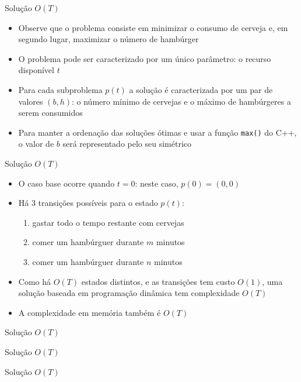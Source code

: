 \begin{frame}[fragile]{Solução $O(T)$}

    \begin{itemize}
        \item Observe que o problema consiste em minimizar o consumo de cerveja e, em segundo lugar,
            maximizar o número de hambúrger

        \item O problema pode ser caracterizado por um único parâmetro: o recurso disponível
            $t$
        
        \item Para cada subproblema $p(t)$ a solução é caracterizada por um par de valores
            $(b, h)$: o número mínimo de cervejas e o máximo de hambúrgeres a serem consumidos 

        \item Para manter a ordenação das soluções ótimas e usar a função \texttt{max()} do 
            C++, o valor de $b$ será representado pelo seu simétrico
   \end{itemize}

\end{frame}

\begin{frame}[fragile]{Solução $O(T)$}

    \begin{itemize}
        \item O caso base ocorre quando $t = 0$: neste caso, $p(0) = (0, 0)$
            
        \item Há 3 transições possíveis para o estado $p(t)$:

        \begin{enumerate}
            \item gastar todo o tempo restante com cervejas
            \item comer um hambúrguer durante $m$ minutos
            \item comer um hambúrguer durante $n$ minutos
        \end{enumerate}

        \item Como há $O(T)$ estados distintos, e as transições tem custo $O(1)$, uma solução
            baseada em programação dinâmica tem complexidade $O(T)$

        \item A complexidade em memória também é $O(T)$
   \end{itemize}

\end{frame}

\begin{frame}[fragile]{Solução $O(T)$}
\end{frame}

\begin{frame}[fragile]{Solução $O(T)$}
\end{frame}

\begin{frame}[fragile]{Solução $O(T)$}
\end{frame}
